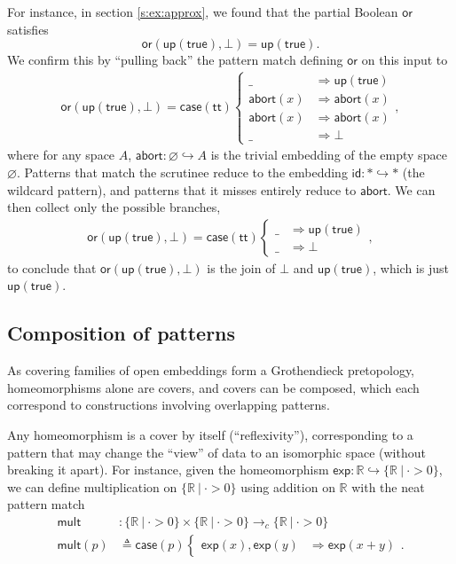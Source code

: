 \documentclass[conference]{IEEEtran}
\newcommand{\hookto}{\hookrightarrow}
\newcommand{\cto}{\to_c}
\newcommand{\R}{\mathbb{R}}
\newcommand{\suchthat}{\ |\ }
\newcommand{\Zero}{\varnothing}
\newcommand{\One}{\ast}
\newcommand{\wildcard}{\_}
\newcommand{\Branch}{\Rightarrow}
\newcommand{\up}{\mathsf{up}}
\newcommand{\btrue}{\mathsf{true}}
\newcommand{\grammar}[1]{\textcolor{red}{\underline{#1}}}
\renewcommand{\grammar}[1]{#1}
\begin{document}
For instance, in section \ref{s:ex:approx}, we found that the partial Boolean $\mathsf{or}$ satisfies
\[
\mathsf{or}(\mathsf{up}(\mathsf{true}), \bot) = \mathsf{up}(\mathsf{true}).
\]
We confirm \grammar{this} by ``pulling back'' the pattern match defining $\mathsf{or}$ on this input to
\begin{align*}
\mathsf{or}(\mathsf{up}(\mathsf{true}), \bot) = \mathsf{case}(\mathsf{tt})
\begin{cases}
\wildcard &\Branch \up(\btrue)
\\ \mathsf{abort}(x) &\Branch \mathsf{abort}(x)
\\ \mathsf{abort}(x) &\Branch \mathsf{abort}(x)
\\ \wildcard &\Branch \bot
\end{cases},
\end{align*}
where for any space $A$, $\mathsf{abort} : \Zero \hookto A$ is the trivial embedding of the empty space $\Zero$. Patterns that match the scrutinee reduce to the embedding $\mathsf{id} : \One \hookto \One$ (the wildcard pattern), and patterns that it misses entirely reduce to $\mathsf{abort}$. We can then collect only the possible branches,
\begin{align*}
\mathsf{or}(\mathsf{up}(\mathsf{true}), \bot) = \mathsf{case}(\mathsf{tt})
\begin{cases}
\wildcard &\Branch \up(\btrue)
\\ \wildcard &\Branch \bot
\end{cases},
\end{align*}
to conclude that $\mathsf{or}(\mathsf{up}(\mathsf{true}), \bot)$ is the join of $\bot$ and $\mathsf{up}(\mathsf{true})$, which is just $\mathsf{up}(\mathsf{true})$.

\subsection{Composition of patterns}

As covering families of open embeddings form a Grothendieck pretopology, homeomorphisms alone are covers, and covers can be composed, which each correspond to constructions involving overlapping patterns.

Any homeomorphism is a cover by itself (``reflexivity''), corresponding to a pattern that may change the ``view'' of data to an isomorphic space (without breaking it apart). For instance, given the homeomorphism $\mathsf{exp} : \R \hookto \{ \R \suchthat \cdot > 0 \}$, we can define multiplication on $\{\R \suchthat \cdot > 0 \}$ using addition on $\R$ with the neat pattern match
\begin{align*}
\mathsf{mult} &: \{\R \suchthat \cdot > 0 \} \times \{\R \suchthat \cdot > 0 \} \cto \{\R \suchthat \cdot > 0 \}
\\ \mathsf{mult}(p) &\triangleq \mathsf{case}(p)
\begin{cases}
\mathsf{exp}(x), \mathsf{exp}(y) &\Branch \mathsf{exp}(x + y)
\end{cases}.
\end{align*}
\end{document}
